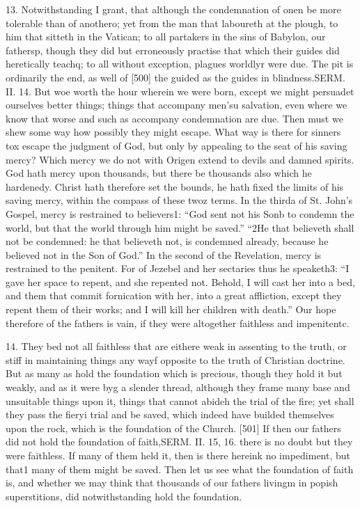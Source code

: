 13. Notwithstanding I grant, that although the condemnation of onen be more tolerable than of anothero; yet from the man that laboureth at the plough, to him that sitteth in the Vatican; to all partakers in the sins of Babylon, our fathersp, though they did but erroneously practise that which their guides did heretically teachq; to all without exception, plagues worldlyr were due. The pit is ordinarily the end, as well of [500] the guided as the guides in blindness.SERM. II. 14. But woe worth the hour wherein we were born, except we might persuadet ourselves better things; things that accompany men’su salvation, even where we know that worse and such as accompany condemnation are due. Then must we shew some way how possibly they might escape. What way is there for sinners tox escape the judgment of God, but only by appealing to the seat of his saving mercy? Which mercy we do not with Origen extend to devils and damned spirits. God hath mercy upon thousands, but there be thousands also which he hardenedy. Christ hath therefore set the bounds, he hath fixed the limits of his saving mercy, within the compass of these twoz terms. In the thirda of St. John’s Gospel, mercy is restrained to believers1: “God sent not his Sonb to condemn the world, but that the world through him might be saved.” “2He that believeth shall not be condemned: he that believeth not, is condemned already, because he believed not in the Son of God.” In the second of the Revelation, mercy is restrained to the penitent. For of Jezebel and her sectaries thus he speaketh3: “I gave her space to repent, and she repented not. Behold, I will cast her into a bed, and them that commit fornication with her, into a great affliction, except they repent them of their works; and I will kill her children with death.” Our hope therefore of the fathers is vain, if they were altogether faithless and impenitentc.

14. They bed not all faithless that are eithere weak in assenting to the truth, or stiff in maintaining things any wayf opposite to the truth of Christian doctrine. But as many as hold the foundation which is precious, though they hold it but weakly, and as it were byg a slender thread, although they frame many base and unsuitable things upon it, things that cannot abideh the trial of the fire; yet shall they pass the fieryi trial and be saved, which indeed have builded themselves upon the rock, which is the foundation of the Church. [501] If then our fathers did not hold the foundation of faith,SERM. II. 15, 16. there is no doubt but they were faithless. If many of them held it, then is there hereink no impediment, but that1 many of them might be saved. Then let us see what the foundation of faith is, and whether we may think that thousands of our fathers livingm in popish superstitions, did notwithstanding hold the foundation.

